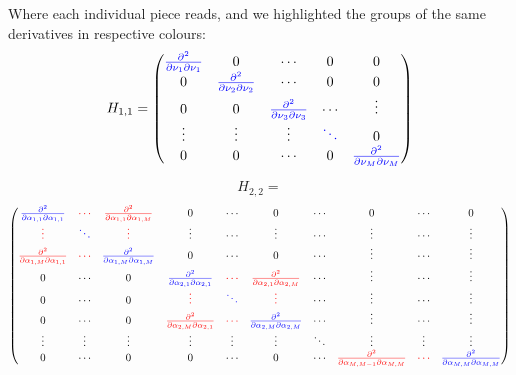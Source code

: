 Where each individual piece reads, and we highlighted the groups of the same derivatives in respective colours:
\begin{equation}
H_{1,1} = 
\begin{pmatrix}
\textcolor{blue}{\frac{\partial^2 } {\partial \nu_1 \partial \nu_1 }} & 0       & \cdots & 0 & 0       \\
0      & \textcolor{blue}{\frac{\partial^2 } {\partial \nu_2 \partial \nu_2 }}
  & \cdots      &  0 & 0       \\
0      & 0       &  \textcolor{blue}{\frac{\partial^2 } {\partial \nu_3 \partial \nu_3 }}
     & \cdots & \vdots  \\
\vdots & \vdots  & \vdots & \textcolor{blue}{\ddots} & 0       \\
0      & 0       & \cdots & 0      & \textcolor{blue}{\frac{\partial^2 } {\partial \nu_M \partial \nu_M }}
\end{pmatrix}
\end{equation}

$$ H_{2,2} = $$
\begin{equation}
\begin{pmatrix}
\textcolor{blue}{\frac{\partial^2 } {\partial \alpha_{1,1} \partial \alpha_{1,1} }          } 
&
 \textcolor{red}{\cdots }
& 
 \textcolor{red}{\frac{\partial^2 }{\partial \alpha_{1,1} \partial \alpha_{1,M} } } 
&
0 & \cdots & 0 & 
\cdots & 0 & 
 \cdots 
&
  0      
\\%
\textcolor{red}{\vdots  }     &  \textcolor{blue}{\ddots }  & \textcolor{red}{\vdots} & \vdots & \cdots & \vdots   & \cdots & \vdots & \cdots & \vdots  
\\%
\textcolor{red}{\frac{\partial^2 }{\partial \alpha_{1,M} \partial \alpha_{1,1} } } & 
\textcolor{red}{\cdots}  & 
\textcolor{blue}{\frac{\partial^2 }{\partial \alpha_{1,M} \partial \alpha_{1,M} }} & 
 0 & \cdots & 0 & \cdots   & \vdots & \cdots & \vdots     
\\%
0  & 
\cdots & 0 & 
\textcolor{blue}{\frac{\partial^2 } {\partial \alpha_{2,1} \partial \alpha_{2,1} }} &
\textcolor{red}{\cdots} & 
\textcolor{red}{\frac{\partial^2 } {\partial \alpha_{2,1} \partial \alpha_{2,M} }}      & 
\cdots & \vdots & \cdots & \vdots
\\%
0  & 
\cdots & 0 & 
\textcolor{red}{\vdots} &
\textcolor{blue}{\ddots }& 
\textcolor{red}{\vdots } & 
\cdots & \vdots & \cdots & \vdots
\\ %
0 &
\cdots & 0 & 
\textcolor{red}{\frac{\partial^2 } {\partial \alpha_{2,M} \partial \alpha_{2,1} }} &
\textcolor{red}{\cdots} & 
\textcolor{blue}{\frac{\partial^2 } {\partial \alpha_{2,M} \partial \alpha_{2,M} }}      & 
\cdots & \vdots & \cdots & \vdots
\\ %
\vdots    &
\vdots & 
\vdots      & 
\vdots & \vdots & \vdots & \ddots &
\vdots & 
\vdots & 
\vdots
\\ %
0      & 
\cdots & 
0      & 
0 & 
\cdots & 
0  & \cdots &
\textcolor{red}{\frac{\partial^2 } {\partial \alpha_{M,M-1} \partial \alpha_{M,M} }} &
\textcolor{red}{\cdots} & 
\textcolor{blue}{\frac{\partial^2 } {\partial \alpha_{M,M} \partial \alpha_{M,M} }}
\end{pmatrix}
\end{equation}




